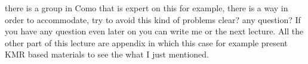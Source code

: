 there is a group in Como that is expert on this for example, there is a way in order to accommodate, try to avoid this kind of problems clear? any question? If you have any question even later on you can write me or the next lecture.
All the other part of this lecture are appendix in which this case for example present KMR based materials to see the what I just mentioned.
